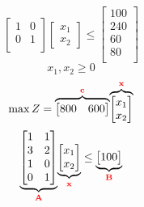 \documentclass{beamer}
\begin{document}
\begin{frame}
\begin{columns}
\begin{column}{0.5\textwidth}
{\begin{equation*}
\begin{bmatrix}
							1 & 0  \\
							0 & 1 \\
					\end{bmatrix}
					\begin{bmatrix}
						x_1 \\
						x_2
					\end{bmatrix} \le
					\begin{bmatrix}
						100 \\
						240 \\
						60 \\
						80 \\
					\end{bmatrix}
				\end{equation*}
				\begin{equation*}
					x_1, x_2 \ge 0 
				\end{equation*}
			}
			\only<2>
			{
				\begin{equation*}
				\max Z = \overset{\mathbf{\color{red}c}}{\overbrace
								    {
									  \begin{bmatrix}
											800 & 600 \\ 
									  \end{bmatrix} 
									}
									}
						 \overset{\mathbf{\color{red}x}}{\overbrace
									{
									\begin{bmatrix}
										x_1 \\
										x_2 \\
									\end{bmatrix}
								  }
								  }
				\end{equation*}
				\begin{equation*}
					\underset{\mathbf{\color{red}A}}{\underbrace
								{
									\begin{bmatrix}
										1 & 1 \\
										3 & 2 \\
										1 & 0  \\
										0 & 1 \\
									\end{bmatrix}
								}}
					\underset{\mathbf{\color{red}x}}{\underbrace
								{
									\begin{bmatrix}
										x_1 \\
										x_2 \\
									\end{bmatrix} 
								}}
					\le
					\underset{\mathbf{\color{red}B}}{\underbrace
								{
									\begin{bmatrix}
										100 \\

\end{bmatrix}}}
\end{equation*}}
\end{column}
\end{columns}
\end{frame}
\end{document}

